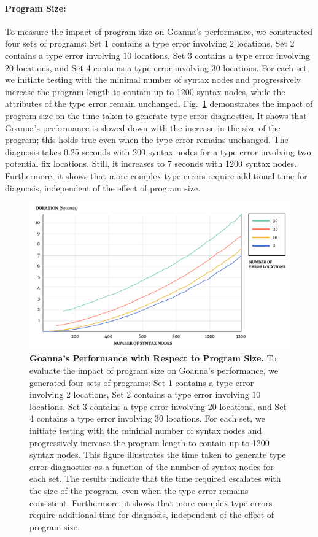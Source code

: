 \documentclass[pdflatex,lineno,sn-nature,Numbered]{sn-jnl}%
\begin{document}
\paragraph{Program Size:}
To measure the impact of program size on Goanna's performance, we constructed four sets of programs: Set 1 contains a type error involving 2 locations, Set 2 contains a type error involving 10 locations, Set 3 contains a type error involving 20 locations, and Set 4 contains a type error involving 30 locations. For each set, we initiate testing with the minimal number of syntax nodes and progressively increase the program length to contain up to 1200 syntax nodes, while the attributes of the type error remain unchanged. Fig.~\ref{fig:node-size} demonstrates the impact of program size on the time taken to generate type error diagnostics. It shows that Goanna's performance is slowed down with the increase in the size of the program; this holds true even when the type error remains unchanged. The diagnosis takes 0.25 seconds with 200 syntax nodes for a type error involving two potential fix locations. Still, it increases to 7 seconds with 1200 syntax nodes. Furthermore, it shows that more complex type errors require additional time for diagnosis, independent of the effect of program size.

\begin{figure}[ht]
    \centering
    \includegraphics[width=\linewidth]{images/SyntaxNodesDuration}
    \caption{{\bf Goanna's Performance with Respect to Program Size.} To evaluate the impact of program size on Goanna's performance, we generated four sets of programs: Set 1 contains a type error involving 2 locations, Set 2 contains a type error involving 10 locations, Set 3 contains a type error involving 20 locations, and Set 4 contains a type error involving 30 locations. For each set, we initiate testing with the minimal number of syntax nodes and progressively increase the program length to contain up to 1200 syntax nodes. This figure illustrates the time taken to generate type error diagnostics as a function of the number of syntax nodes for each set. The results indicate that the time required escalates with the size of the program, even when the type error remains consistent. Furthermore, it shows that more complex type errors require additional time for diagnosis, independent of the effect of program size.}
    \label{fig:node-size}
\end{figure}
\end{document}

